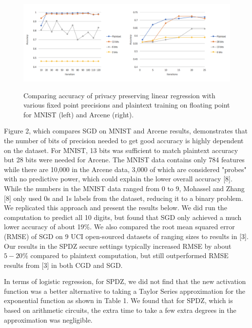 \documentclass{article}
\begin{document}
\begin{figure}[h!]
\vspace{-4mm}
\centering
  \includegraphics[scale=0.6]{mnistarcene.png}
  \label{fig:result4}
  \vspace{-4mm}
   \caption{Comparing accuracy of privacy preserving linear regression with various fixed point precisions and plaintext training on floating point for MNIST (left) and Arcene (right).}
   \vspace{-4mm}
\end{figure}

Figure 2, which compares SGD on MNIST and Arcene results, demonstrates that the number of bits of precision needed to get good accuracy is highly dependent on the dataset. For MNIST, 13 bits was sufficient to match plaintext accuracy but 28 bits were needed for Arcene. The MNIST data contains only 784 features while there are 10,000 in the Arcene data, 3,000 of which are considered "probes" with no predictive power, which could explain the lower overall accuracy [8]. While the numbers in the MNIST data ranged from 0 to 9, Mohassel and Zhang [8] only used 0s and 1s labels from the dataset, reducing it to a binary problem. We replicated this approach and present the results below. We did run the computation to predict all 10 digits, but found that SGD only achieved a much lower accuracy of about 19\%. We also compared the root mean squared error (RMSE) of SGD on 9 UCI open-sourced datasets of ranging sizes to results in [3]. Our results in the SPDZ secure settings typically increased RMSE by about $5-20\%$ compared to plaintext computation, but still outperformed RMSE results from [3] in both CGD and SGD.

In terms of logistic regression, for SPDZ, we did not find that the new activation function was a better alternative to taking a Taylor Series approximation for the exponential function as shown in Table 1. We found that for SPDZ, which is based on arithmetic circuits, the extra time to take a few extra degrees in the approximation was negligible.  
\end{document}
